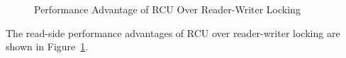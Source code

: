 \begin{figure}[tb]
\centering
{}
\caption{Performance Advantage of RCU Over Reader-Writer Locking}
\label{fig:defer:Performance Advantage of RCU Over Reader-Writer Locking}
\end{figure}

The read-side performance advantages of RCU over reader-writer locking
are shown in
Figure~\ref{fig:defer:Performance Advantage of RCU Over Reader-Writer Locking}.

